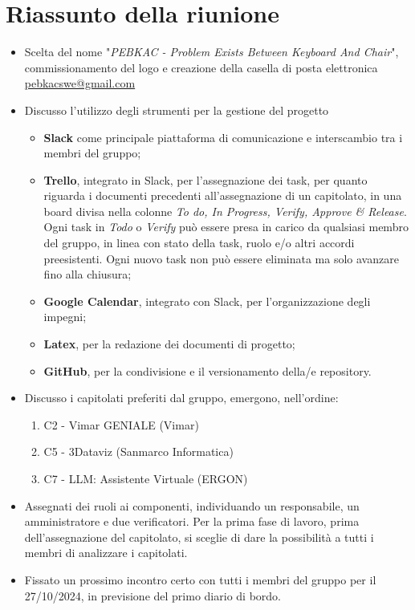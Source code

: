 \section{Riassunto della riunione}
\begin{itemize}
    \item Scelta del nome "\textit{PEBKAC - Problem Exists Between Keyboard And Chair}", commissionamento del logo e creazione della casella di posta elettronica \href{mailto:pebkacswe@gmail.com}{pebkacswe@gmail.com}
  \item Discusso  l'utilizzo degli strumenti per la gestione del progetto
  \begin{itemize}
    \item \textbf{Slack} come principale piattaforma di comunicazione e interscambio tra i membri del gruppo;
    \item \textbf{Trello}, integrato in Slack, per l'assegnazione dei task,  per quanto riguarda i documenti precedenti all'assegnazione di un capitolato, in una board divisa nella colonne \textit{To do, In Progress, Verify, Approve \& Release}. Ogni task in \textit{Todo} o \textit{Verify} può essere presa in carico da qualsiasi membro del gruppo, in linea con stato della task, ruolo e/o altri accordi preesistenti. Ogni nuovo task non può essere eliminata ma solo avanzare fino alla chiusura;
    \item \textbf{Google Calendar}, integrato con Slack, per l'organizzazione degli impegni;
    \item \textbf{Latex}, per la redazione dei documenti di progetto;
  \item \textbf{GitHub}, per la condivisione e il versionamento della/e repository.
  \end{itemize}
    \item Discusso i capitolati preferiti dal gruppo, emergono, nell'ordine:
    \begin{enumerate}
        \item C2 - Vimar GENIALE (Vimar)
        \item C5 - 3Dataviz (Sanmarco Informatica)
        \item C7 - LLM: Assistente Virtuale (ERGON)
    \end{enumerate}
  \item Assegnati dei ruoli ai componenti, individuando un responsabile, un amministratore e due verificatori. Per la prima fase di lavoro, prima dell'assegnazione del capitolato, si sceglie di dare la possibilità a tutti i membri di analizzare i capitolati.
  \item Fissato un prossimo incontro certo con tutti i membri del gruppo per il 27/10/2024, in previsione del primo diario di bordo.
  

\end{itemize}